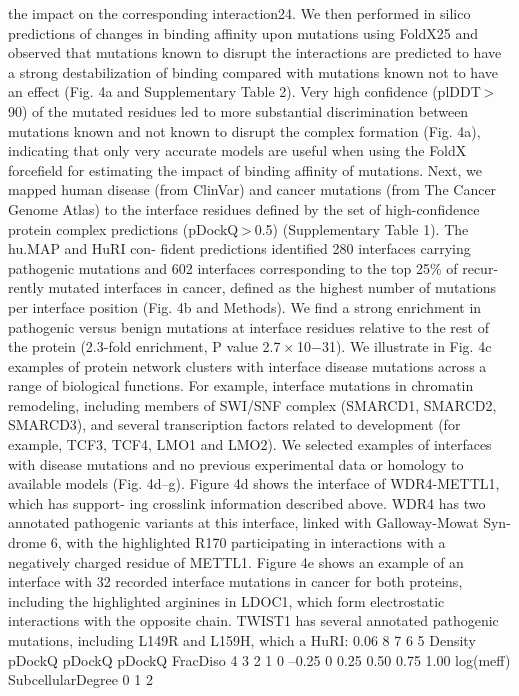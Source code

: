 the impact on the corresponding interaction24. We then performed
in silico predictions of changes in binding affinity upon mutations
using FoldX25 and observed that mutations known to disrupt the
interactions are predicted to have a strong destabilization of binding
compared with mutations known not to have an effect (Fig. 4a and
Supplementary Table 2). Very high confidence (plDDT > 90) of the
mutated residues led to more substantial discrimination between
mutations known and not known to disrupt the complex formation
(Fig. 4a), indicating that only very accurate models are useful when
using the FoldX forcefield for estimating the impact of binding affinity
of mutations.
Next, we mapped human disease (from ClinVar) and cancer
mutations (from The Cancer Genome Atlas) to the interface residues
defined by the set of high-confidence protein complex predictions
(pDockQ > 0.5) (Supplementary Table 1). The hu.MAP and HuRI con-
fident predictions identified 280 interfaces carrying pathogenic
mutations and 602 interfaces corresponding to the top 25\% of recur-
rently mutated interfaces in cancer, defined as the highest number
of mutations per interface position (Fig. 4b and Methods). We find a
strong enrichment in pathogenic versus benign mutations at interface
residues relative to the rest of the protein (2.3-fold enrichment, P value
2.7 × 10−31).
We illustrate in Fig. 4c examples of protein network clusters with
interface disease mutations across a range of biological functions.
For example, interface mutations in chromatin remodeling, including
members of SWI/SNF complex (SMARCD1, SMARCD2, SMARCD3), and
several transcription factors related to development (for example,
TCF3, TCF4, LMO1 and LMO2).
We selected examples of interfaces with disease mutations and no
previous experimental data or homology to available models (Fig. 4d–g).
Figure 4d shows the interface of WDR4-METTL1, which has support-
ing crosslink information described above. WDR4 has two annotated
pathogenic variants at this interface, linked with Galloway-Mowat Syn-
drome 6, with the highlighted R170 participating in interactions with
a negatively charged residue of METTL1. Figure 4e shows an example
of an interface with 32 recorded interface mutations in cancer for both
proteins, including the highlighted arginines in LDOC1, which form
electrostatic interactions with the opposite chain. TWIST1 has several
annotated pathogenic mutations, including L149R and L159H, which
a
HuRI: 0.06
8
7
6
5
Density
pDockQ
pDockQ
pDockQ
FracDiso
4
3
2
1
0
–0.25
0
0.25
0.50
0.75
1.00
log(meﬀ)
SubcellularDegree
0
1
2

